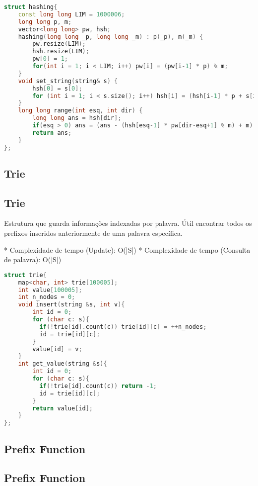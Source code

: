 \documentclass[11pt, a4paper, twoside]{article}
\begin{document}
\begin{lstlisting}[language=C++]
struct hashing{
    const long long LIM = 1000006;
    long long p, m;
    vector<long long> pw, hsh;
    hashing(long long _p, long long _m) : p(_p), m(_m) {
        pw.resize(LIM);
        hsh.resize(LIM);
        pw[0] = 1;
        for(int i = 1; i < LIM; i++) pw[i] = (pw[i-1] * p) % m;
    }
    void set_string(string& s) {
        hsh[0] = s[0];
        for (int i = 1; i < s.size(); i++) hsh[i] = (hsh[i-1] * p + s[i]) % m;
    }
    long long range(int esq, int dir) {
        long long ans = hsh[dir];
        if(esq > 0) ans = (ans - (hsh[esq-1] * pw[dir-esq+1] % m) + m) % m;
        return ans;
    }
};
\end{lstlisting}

\subsection{Trie}

\subsection{Trie}



Estrutura que guarda informações indexadas por palavra.   
Útil encontrar todos os prefixos inseridos anteriormente de uma palavra específica.

* Complexidade de tempo (Update): O(|S|)
* Complexidade de tempo (Consulta de palavra): O(|S|)

\begin{lstlisting}[language=C++]
struct trie{
    map<char, int> trie[100005];
    int value[100005];
    int n_nodes = 0;
    void insert(string &s, int v){
        int id = 0;
        for (char c: s){
          if(!trie[id].count(c)) trie[id][c] = ++n_nodes;
          id = trie[id][c];
        }
        value[id] = v;
    }
    int get_value(string &s){
        int id = 0;
        for (char c: s){
          if(!trie[id].count(c)) return -1;
          id = trie[id][c];
        }
        return value[id];
    }
};
\end{lstlisting}

\subsection{Prefix Function}

\subsection{Prefix Function}
\end{document}
